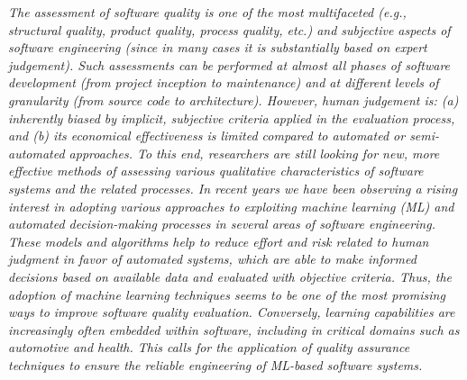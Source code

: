 \begin{myquote}{0.2in}
    \itshape
    The assessment of software quality is one of the most multifaceted (e.g., structural quality, product quality, process quality, etc.) and subjective aspects of software engineering (since in many cases it is substantially based on expert judgement).
    Such assessments can be performed at almost all phases of software development (from project inception to maintenance) and at different levels of granularity (from source code to architecture). However, human judgement is: (a) inherently biased by implicit, subjective criteria applied in the evaluation process, and (b) its economical effectiveness is limited compared to automated or semi-automated approaches.
    To this end, researchers are still looking for new, more effective methods of assessing various qualitative characteristics of software systems and the related processes.
    In recent years we have been observing a rising interest in adopting various approaches to exploiting machine learning (ML) and automated decision-making processes in several areas of software engineering. These models and algorithms help to reduce effort and risk related to human judgment in favor of automated systems, which are able to make informed decisions based on available data and evaluated with objective criteria.
    Thus, the adoption of machine learning techniques seems to be one of the most promising ways to improve software quality evaluation. 
    Conversely, learning capabilities are increasingly often embedded within software, including in critical domains such as automotive and health.
    This calls for the application of quality assurance techniques to ensure the reliable engineering of ML-based software systems.
\end{myquote}
